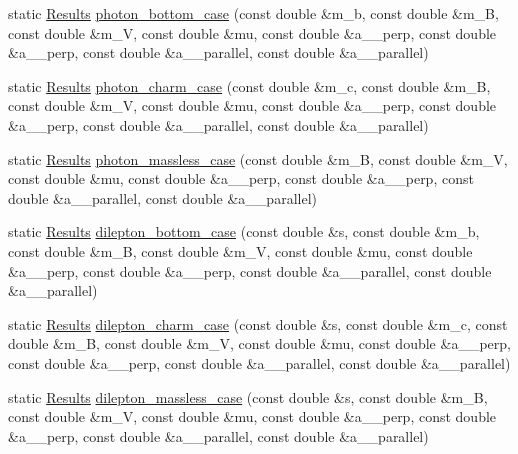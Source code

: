 \begin{DoxyCompactItemize}
\item 
static \hyperlink{structeos_1_1QCDFIntegrals_1_1Results}{Results} \hyperlink{classeos_1_1QCDFIntegrals_af6508bca0f6425fcefc36a75699fd505}{photon\_\-bottom\_\-case} (const double \&m\_\-b, const double \&m\_\-B, const double \&m\_\-V, const double \&mu, const double \&a\_\_\-perp, const double \&a\_\_\-perp, const double \&a\_\_\-parallel, const double \&a\_\_\-parallel)
\item 
static \hyperlink{structeos_1_1QCDFIntegrals_1_1Results}{Results} \hyperlink{classeos_1_1QCDFIntegrals_a9d43810ac4bee250bdd71f4b13a8535a}{photon\_\-charm\_\-case} (const double \&m\_\-c, const double \&m\_\-B, const double \&m\_\-V, const double \&mu, const double \&a\_\_\-perp, const double \&a\_\_\-perp, const double \&a\_\_\-parallel, const double \&a\_\_\-parallel)
\item 
static \hyperlink{structeos_1_1QCDFIntegrals_1_1Results}{Results} \hyperlink{classeos_1_1QCDFIntegrals_a20d1967a85e3601633adf14ee4736508}{photon\_\-massless\_\-case} (const double \&m\_\-B, const double \&m\_\-V, const double \&mu, const double \&a\_\_\-perp, const double \&a\_\_\-perp, const double \&a\_\_\-parallel, const double \&a\_\_\-parallel)
\item 
static \hyperlink{structeos_1_1QCDFIntegrals_1_1Results}{Results} \hyperlink{classeos_1_1QCDFIntegrals_a4685503430ba2e37d0a950efbb5db144}{dilepton\_\-bottom\_\-case} (const double \&s, const double \&m\_\-b, const double \&m\_\-B, const double \&m\_\-V, const double \&mu, const double \&a\_\_\-perp, const double \&a\_\_\-perp, const double \&a\_\_\-parallel, const double \&a\_\_\-parallel)
\item 
static \hyperlink{structeos_1_1QCDFIntegrals_1_1Results}{Results} \hyperlink{classeos_1_1QCDFIntegrals_afd6226e6800deeec288306c490da5893}{dilepton\_\-charm\_\-case} (const double \&s, const double \&m\_\-c, const double \&m\_\-B, const double \&m\_\-V, const double \&mu, const double \&a\_\_\-perp, const double \&a\_\_\-perp, const double \&a\_\_\-parallel, const double \&a\_\_\-parallel)
\item 
static \hyperlink{structeos_1_1QCDFIntegrals_1_1Results}{Results} \hyperlink{classeos_1_1QCDFIntegrals_a46d8f57850d80b92498c15caac8b0229}{dilepton\_\-massless\_\-case} (const double \&s, const double \&m\_\-B, const double \&m\_\-V, const double \&mu, const double \&a\_\_\-perp, const double \&a\_\_\-perp, const double \&a\_\_\-parallel, const double \&a\_\_\-parallel)
\end{DoxyCompactItemize}


